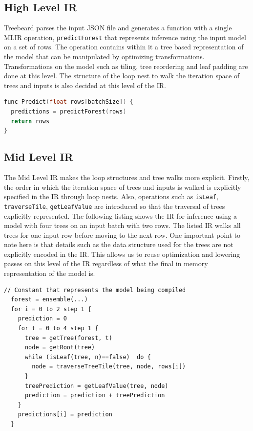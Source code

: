 \subsection{High Level IR}
Treebeard parses the input JSON file and generates a function with a single MLIR operation, \texttt{predictForest} that represents inference using the input model on a set of rows. The operation contains within it a tree based representation of the model that can be manipulated by optimizing transformations. Transformations on the model such as tiling, tree reordering and leaf padding are done at this level. The structure of the loop nest to walk the iteration space of trees and inputs is also decided at this level of the IR. 

\begin{lstlisting}[language=C++]
func Predict(float rows[batchSize]) {
  predictions = predictForest(rows) 
  return rows
}
\end{lstlisting}

\subsection{Mid Level IR}
The Mid Level IR makes the loop structures and tree walks more explicit. Firstly, the order in which the iteration space of trees and inputs is walked is explicitly specified in the IR through loop nests. Also, operations such as \texttt{isLeaf}, \texttt{traverseTile}, \texttt{getLeafValue} are introduced so that the traversal of trees explicitly represented. The following listing shows the IR for inference using a model with four trees on an input batch with two rows. The listed IR walks all trees for one input row before moving to the next row. One important point to note here is that details such as the data structure used for the trees are not explicitly encoded in the IR. This allows us to reuse optimization and lowering passes on this level of the IR regardless of what the final in memory representation of the model is.

\begin{lstlisting}[style=c++]
  // Constant that represents the model being compiled
  forest = ensemble(...)
  for i = 0 to 2 step 1 {
    prediction = 0
    for t = 0 to 4 step 1 {
      tree = getTree(forest, t) 
      node = getRoot(tree)
      while (isLeaf(tree, n)==false)  do {
        node = traverseTreeTile(tree, node, rows[i])
      }
      treePrediction = getLeafValue(tree, node)
      prediction = prediction + treePrediction
    }
    predictions[i] = prediction
  }
\end{lstlisting}


